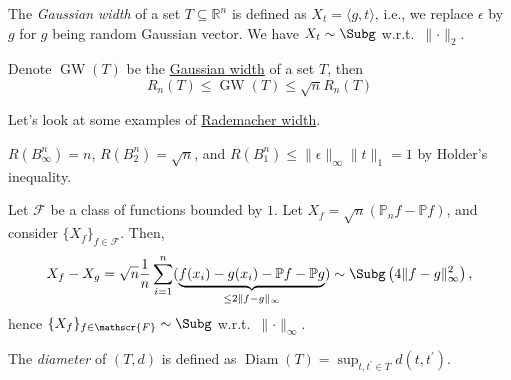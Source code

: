 \begin{eg}\label{eg:Gaussian-width}
	The \emph{Gaussian width} of a set \(T \subseteq \mathbb{R} ^n\) is defined as \(X_t = \langle g, t \rangle \), i.e., we replace \(\epsilon \) by \(g\) for \(g\) being random Gaussian vector. We have \(X_t \sim \Subg\) w.r.t.\ \(\lVert \cdot \rVert _2\).
\end{eg}

\begin{theorem}
	Denote \(\mathop{\mathrm{GW}}(T) \) be the \hyperref[eg:Gaussian-width]{Gaussian width} of a set \(T\), then
	\[
		R_n(T) \leq \mathop{\mathrm{GW}}(T) \leq \sqrt{n} R_n(T)
	\]
\end{theorem}

Let's look at some examples of \hyperref[def:Rademacher-width]{Rademacher width}.

\begin{eg}
	\(R(B_\infty ^n) = n\), \(R(B_2^n)= \sqrt{n} \), and \(R(B_1^n) \leq \lVert \epsilon \rVert _\infty \lVert t \rVert _1 = 1\) by Holder's inequality.
\end{eg}

\begin{eg}
	Let \(\mathscr{F} \) be a class of functions bounded by \(1\). Let \(X_f = \sqrt{n} (\mathbb{P} _n f - \mathbb{P} f)\), and consider \(\{ X_f \}_{f\in \mathscr{F} } \). Then,
	\[
		X_f - X_g
		= \sqrt{n} \frac{1}{n}\sum_{i=1}^{n} ( \underbrace{f(x_i) - g(x_i) - \mathbb{P} f - \mathbb{P} g }_{\leq 2 \lVert f-g \rVert _\infty })
		\sim \Subg\left( 4 \lVert f - g \rVert _\infty ^2 \right) ,
	\]
	hence \(\{ X_f \} _{f\in \mathscr{F} } \sim \Subg\) w.r.t.\ \(\lVert \cdot \rVert _\infty \).
\end{eg}

\begin{definition}[Diameter]\label{def:diameter}
	The \emph{diameter} of \((T, d)\) is defined as \(\mathop{\mathrm{Diam}}(T) = \sup _{t, t^{\prime} \in T} d(t, t^{\prime} )\).
\end{definition}

